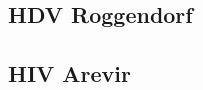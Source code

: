\documentclass[a4paper,11pt]{article}
\begin{document}
  

\FloatBarrier
\subsection*{HDV Roggendorf}


\FloatBarrier
\subsection*{HIV Arevir}

  
  
\end{document}
